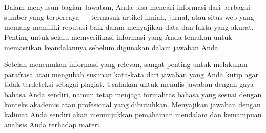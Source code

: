 %
%
%
\chapter{\Jawaban}


Dalam menyusun bagian Jawaban, Anda bisa mencari informasi dari berbagai sumber yang terpercaya --- termasuk artikel ilmiah, jurnal, atau situs web yang memang memiliki reputasi baik dalam menyajikan data dan fakta yang akurat. Penting untuk selalu memverifikasi informasi yang Anda temukan untuk memastikan keandalannya sebelum digunakan dalam jawaban Anda.

Setelah menemukan informasi yang relevan, sangat penting untuk melakukan parafrasa atau mengubah susunan kata-kata dari jawaban yang Anda kutip agar tidak terdeteksi sebagai plagiat. Usahakan untuk menulis jawaban dengan gaya bahasa Anda sendiri, namun tetap menjaga formalitas bahasa yang sesuai dengan konteks akademis atau profesional yang dibutuhkan. Menyajikan jawaban dengan kalimat Anda sendiri akan menunjukkan pemahaman mendalam dan kemampuan analisis Anda terhadap materi.